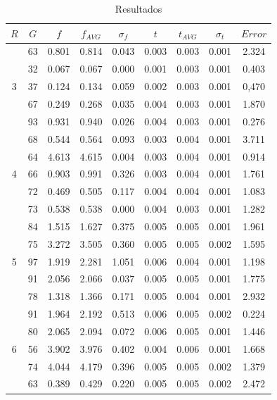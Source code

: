 \documentclass[journal]{IEEEtran}
\begin{document}
\begin{table}[h]
\caption{Resultados}
\centering

\begin{tabular}{|c|c|c|c|c|c|c|c|c|}
\hline
$R$ & $G$ & $f$ & $f_{AVG}$ & $\sigma_f$ & $t$ & $t_{AVG}$ & $\sigma_t$ & $Error$ \\
\hline
\multirow{5}{*}{3} & 63 & 0.801 & 0.814 & 0.043 & 0.003 & 0.003 & 0.001 & 2.324 \\
                   & 32 & 0.067 & 0.067 & 0.000 & 0.001 & 0.003 & 0.001 & 0.403 \\
                   & 37 & 0.124 & 0.134 & 0.059 & 0.002 & 0.003 & 0.001 & 0,470 \\
                   & 67 & 0.249 & 0.268 & 0.035 & 0.004 & 0.003 & 0.001 & 1.870 \\
                   & 93 & 0.931 & 0.940 & 0.026 & 0.004 & 0.003 & 0.001 & 0.276 \\ \hline

\multirow{5}{*}{4} & 68 & 0.544 & 0.564 & 0.093 & 0.003 & 0.004 & 0.001 & 3.711 \\
                   & 64 & 4.613 & 4.615 & 0.004 & 0.003 & 0.004 & 0.001 & 0.914 \\
                   & 66 & 0.903 & 0.991 & 0.326 & 0.003 & 0.004 & 0.001 & 1.761 \\
                   & 72 & 0.469 & 0.505 & 0.117 & 0.004 & 0.004 & 0.001 & 1.083 \\
                   & 73 & 0.538 & 0.538 & 0.000 & 0.004 & 0.003 & 0.001 & 1.282 \\ \hline
 
\multirow{5}{*}{5} & 84 & 1.515 & 1.627 & 0.375 & 0.005 & 0.005 & 0.001 & 1.961 \\
                   & 75 & 3.272 & 3.505 & 0.360 & 0.005 & 0.005 & 0.002 & 1.595 \\
                   & 97 & 1.919 & 2.281 & 1.051 & 0.006 & 0.004 & 0.001 & 1.198 \\
                   & 91 & 2.056 & 2.066 & 0.037 & 0.005 & 0.005 & 0.001 & 1.775 \\
                   & 78 & 1.318 & 1.366 & 0.171 & 0.005 & 0.004 & 0.001 & 2.932 \\ \hline
 
\multirow{5}{*}{6} & 91 & 1.964 & 2.192 & 0.513 & 0.006 & 0.005 & 0.002 & 0.224 \\
                   & 80 & 2.065 & 2.094 & 0.072 & 0.006 & 0.005 & 0.001 & 1.446 \\
                   & 56 & 3.902 & 3.976 & 0.402 & 0.004 & 0.006 & 0.001 & 1.668 \\
                   & 74 & 4.044 & 4.179 & 0.396 & 0.005 & 0.005 & 0.002 & 1.379 \\
                   & 63 & 0.389 & 0.429 & 0.220 & 0.005 & 0.005 & 0.002 & 2.472 \\ \hline
 

\end{tabular}
\end{table}
\end{document}
